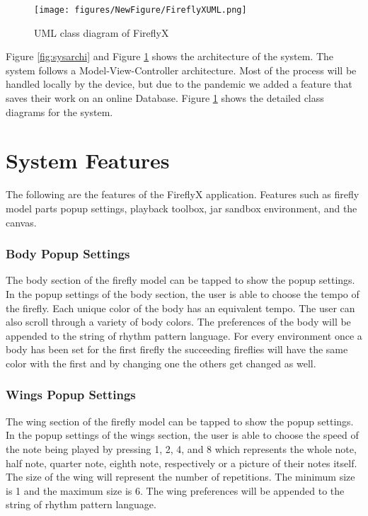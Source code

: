 \begin{figure} [H]
    \centering
    \texttt{[image: figures/NewFigure/FireflyXUML.png]}
    \caption{UML class diagram of FireflyX}
    \label{fig:fireflyxUML}
\end{figure}

Figure \ref{fig:sysarchi} and Figure \ref{fig:fireflyxUML} shows the architecture of the system. The system follows a Model-View-Controller architecture. Most of the process will be handled locally by the device, but due to the pandemic we added a feature that saves their work on an online Database. Figure \ref{fig:fireflyxUML} shows the detailed class diagrams for the system.
    
\section{System Features}
The following are the features of the FireflyX application. Features such as firefly model parts popup settings, playback toolbox, jar sandbox environment, and the canvas.


\subsubsection{Body Popup Settings}
The body section of the firefly model can be tapped to show the popup settings. In the popup settings of the body section, the user is able to choose the tempo of the firefly. Each unique color of the body has an equivalent tempo. The user can also scroll through a variety of body colors. The preferences of the body will be appended to the string of rhythm pattern language. For every environment once a body has been set for the first firefly the succeeding fireflies will have the same color with the first and by changing one the others get changed as well.

\subsubsection{Wings Popup Settings}
The wing section of the firefly model can be tapped to show the popup settings. In the popup settings of the wings section, the user is able to choose the speed of the note being played by pressing 1, 2, 4, and 8 which represents the whole note, half note, quarter note, eighth note, respectively or a picture of their notes itself. The size of the wing will represent the number of repetitions. The minimum size is 1 and the maximum size is 6. The wing preferences will be appended to the string of rhythm pattern language.

